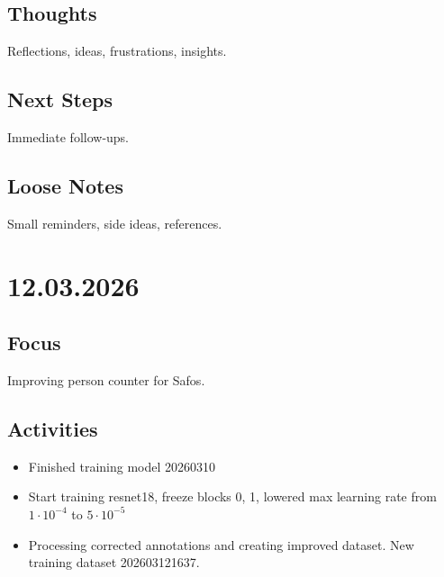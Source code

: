 \documentclass[a4paper]{report}
\begin{document}
\subsection*{Thoughts}
Reflections, ideas, frustrations, insights.

\subsection*{Next Steps}
Immediate follow-ups.

\subsection*{Loose Notes}
Small reminders, side ideas, references.






\section*{12.03.2026}


\subsection*{Focus}
Improving person counter for Safos.

\subsection*{Activities}
\begin{itemize}
	\item Finished training model 20260310
	\item Start training resnet18, freeze blocks 0, 1, lowered max learning rate from $1\cdot 10^{-4}$ to $5\cdot 10^{-5}$
	\item Processing corrected annotations and creating improved dataset. New training dataset 202603121637.
\end{itemize}

\end{document}
